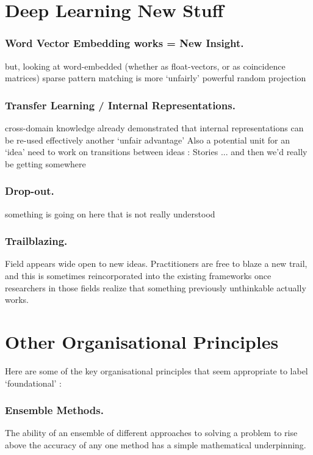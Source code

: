 \documentclass[citeauthoryear]{llncs}
\begin{document}
 
\section{Deep Learning New Stuff}


\subsubsection*{Word Vector Embedding works = New Insight.}
    but, looking at word-embedded (whether as float-vectors, or as coincidence matrices)
      sparse pattern matching is more `unfairly' powerful 
      random projection

\subsubsection*{Transfer Learning / Internal Representations.}
  cross-domain knowledge
    already demonstrated that internal representations can be re-used effectively
    another `unfair advantage'
  Also a potential unit for an `idea'
    need to work on transitions between ideas : Stories
      ... and then we'd really be getting somewhere


\subsubsection*{Drop-out.}
    something is going on here that is not really understood

\subsubsection*{Trailblazing.}
Field appears wide open to new ideas.  Practitioners are free to blaze a new trail, 
and this is sometimes reincorporated into the existing frameworks once 
researchers in those fields realize that something previously unthinkable actually works.


\section{Other Organisational Principles}

Here are some of the key organisational principles that seem appropriate to label `foundational' :

\subsubsection*{Ensemble Methods.}
The ability of an ensemble of different approaches to solving a problem to rise above the accuracy 
of any one method has a simple mathematical underpinning.  
\end{document}
